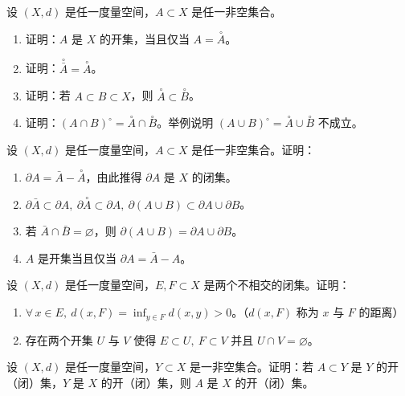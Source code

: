 \begin{exercise}
	\item 设 $(X,d)$ 是任一度量空间，$A\subset X$ 是任一非空集合。
	\begin{enumerate}[label=\arabic*)]
		\item 证明：$A$ 是 $X$ 的开集，当且仅当 $A=\overset{\circ}{A}$。
		\item 证明：$\overset{\circ}{\bar A}=\overset{\circ}{A}$。
		\item 证明：若 $A\subset B\subset X$，则 $\overset{\circ}{A}\subset\overset{\circ}{B}$。
		\item 证明：$(A\cap B)^{\circ}=\overset{\circ}{A}\cap\overset{\circ}{B}$。举例说明 $(A\cup B)^{\circ}=\overset{\circ}{A}\cup\overset{\circ}{B}$ 不成立。
	\end{enumerate}
\end{exercise}

\begin{exercise}
	\item 设 $(X,d)$ 是任一度量空间，$A\subset X$ 是任一非空集合。证明：
	\begin{enumerate}[label=\arabic*)]
		\item $\partial A=\bar A-\overset{\circ}{A}$，由此推得 $\partial A$ 是 $X$ 的闭集。
		\item $\partial\bar A\subset\partial A,\ \partial\overset{\circ}{A}\subset\partial A,\ \partial(A\cup B)\subset\partial A\cup\partial B$。
		\item 若 $\bar A\cap\bar B=\varnothing$，则 $\partial(A\cup B)=\partial A\cup\partial B$。
		\item $A$ 是开集当且仅当 $\partial A=\bar A-A$。
	\end{enumerate}
\end{exercise}

\begin{exercise}
	\item 设 $(X,d)$ 是任一度量空间，$E,F\subset X$ 是两个不相交的闭集。证明：
	\begin{enumerate}[label=\arabic*)]
		\item $\forall\,x\in E,\ d(x,F)=\displaystyle\inf_{y\in F}d(x,y)>0$。（$d(x,F)$ 称为 $x$ 与 $F$ 的距离）
		\item 存在两个开集 $U$ 与 $V$ 使得 $E\subset U,\ F\subset V$ 并且 $U\cap V=\varnothing$。
	\end{enumerate}
\end{exercise}

\begin{exercise}
	\item 设 $(X,d)$ 是任一度量空间，$Y\subset X$ 是一非空集合。证明：若 $A\subset Y$ 是 $Y$ 的开（闭）集，$Y$ 是 $X$ 的开（闭）集，则 $A$ 是 $X$ 的开（闭）集。
\end{exercise}

